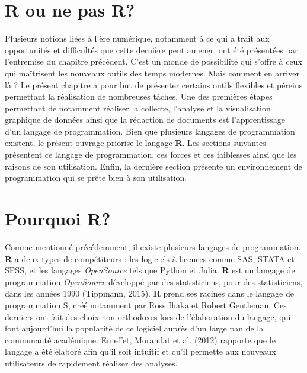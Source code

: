 \documentclass[
  letterpaper,
  DIV=11,
  numbers=noendperiod]{scrreprt}
\begin{document}
\section{R ou ne pas R?}\label{sec-chap4}

Plusieurs notions liées à l'ère numérique, notamment à ce qui a trait
aux opportunités et difficultés que cette dernière peut amener, ont été
présentées par l'entremise du chapitre précédent. C'est un monde de
possibilité qui s'offre à ceux qui maîtrisent les nouveaux outils des
temps modernes. Mais comment en arriver là ? Le présent chapitre a pour
but de présenter certains outils flexibles et péreins permettant la
réalisation de nombreuses tâches. Une des premières étapes permettant de
notamment réaliser la collecte, l'analyse et la visualisation graphique
de données ainsi que la rédaction de documents est l'apprentissage d'un
langage de programmation. Bien que plusieurs langages de programmation
existent, le présent ouvrage priorise le langage \textbf{R}. Les
sections suivantes présentent ce langage de programmation, ces forces et
ces faiblesses ainsi que les raisons de son utilisation. Enfin, la
dernière section présente un environnement de programmation qui se prête
bien à son utilisation.

\section{Pourquoi R?}\label{pourquoi-r}

Comme mentionné précédemment, il existe plusieurs langages de
programmation. \textbf{R} a deux types de compétiteurs : les logiciels à
licences comme SAS, STATA et SPSS, et les langages \emph{OpenSource}
tels que Python et Julia. \textbf{R} est un langage de programmation
\emph{OpenSource} développé par des statisticiens, pour des
statisticiens, dans les années 1990 (Tippmann, 2015). \textbf{R} prend
ses racines dans le langage de programmation S, créé notamment par Ross
Ihaka et Robert Gentleman. Ces derniers ont fait des choix non
orthodoxes lors de l'élaboration du langage, qui font aujourd'hui la
popularité de ce logiciel auprès d'un large pan de la communauté
académique. En effet, Morandat et al. (2012) rapporte que le langage a
été élaboré afin qu'il soit intuitif et qu'il permette aux nouveaux
utilisateurs de rapidement réaliser des analyses.
\end{document}
